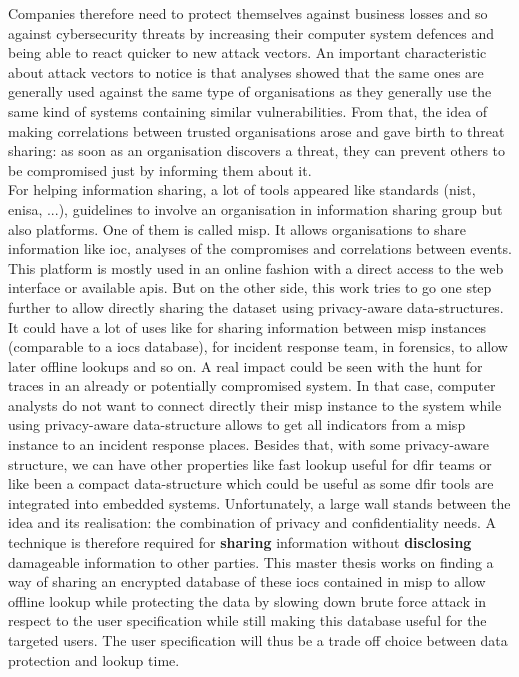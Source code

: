 \documentclass{eplmastersthesis}
\begin{document}
Companies therefore need to protect themselves against business losses and so against cybersecurity threats by increasing their computer system defences and being able to react quicker to new attack vectors. An important characteristic about attack vectors to notice is that analyses showed that the same ones are generally used against the same type of organisations as they generally use the same kind of systems containing similar vulnerabilities. From that, the idea of making correlations between trusted organisations arose and gave birth to threat sharing:  as soon as an organisation discovers a threat, they can prevent others to be compromised just by informing them about it.\\

For helping information sharing, a lot of tools appeared like standards (\gls{nist}, \gls{enisa}, ...), guidelines to involve an organisation in information sharing group but also platforms. One of them is called \gls{misp}. It allows organisations to share information like \gls{ioc}, analyses of the compromises and correlations between events.
This platform is mostly used in an online fashion with a direct access to the web interface or available \glspl{api}.
But on the other side, this work tries to go one step further to allow directly sharing the dataset using privacy-aware data-structures. It could have a lot of uses like for sharing information between \gls{misp} instances (comparable to a \glspl{ioc} database), for incident response team, in forensics, to allow later offline lookups and so on. A real impact could be seen with the hunt for traces in an already or potentially compromised system. In that case, computer analysts do not want to connect directly their \gls{misp} instance to the system while using privacy-aware data-structure allows to get all indicators from a \gls{misp} instance to an incident response places. Besides that, with some privacy-aware structure, we can have other properties like fast lookup useful for \gls{dfir} teams or like been a compact data-structure which could be useful as some \gls{dfir} tools are integrated into embedded systems.
Unfortunately, a large wall stands between the idea and its realisation: the combination of privacy and confidentiality needs.
A technique is therefore required for \textbf{sharing} information without \textbf{disclosing} damageable information to other parties. This master thesis works on finding a way of sharing an encrypted database of these \glspl{ioc} contained in \gls{misp} to allow offline lookup while protecting the data by slowing down brute force attack in respect to the user specification while still making this database useful for the targeted users. The user specification will thus be a trade off choice between data protection and lookup time.\\
\end{document}
